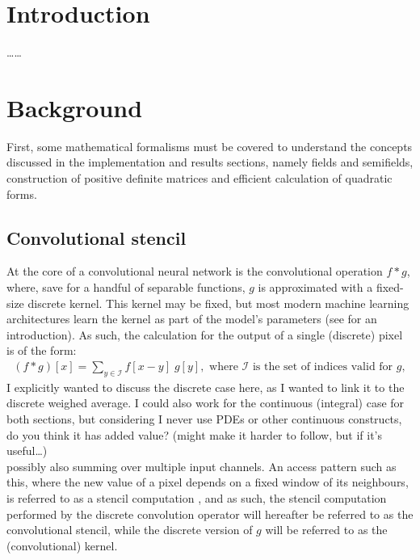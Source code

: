 \documentclass[a4paper, 12pt]{report}
\def\comment#1{\color{red}#1\color{black}}
\begin{document}
\newpage



\setcounter{page}{1}
\pagestyle{plain} 

\chapter{Introduction}
\comment{\ldots\ldots}

\chapter{Background}
First, some mathematical formalisms must be covered to understand the concepts discussed in the implementation and results sections, namely fields and semifields, construction of positive definite matrices and efficient calculation of quadratic forms.

\section{Convolutional stencil}
At the core of a convolutional neural network is the convolutional operation $f*g$, where, save for a handful of separable functions, $g$ is approximated with a fixed-size discrete kernel. This kernel may be fixed, but most modern machine learning architectures learn the kernel as part of the model's parameters (see \cite{introconvnets} for an introduction). As such, the calculation for the output of a single (discrete) pixel is of the form:
\begin{align*}
(f*g)[x] = \sum_{y\in\mathcal{I}} f[x-y]\; g[y]	, \textrm{ where } \mathcal{I} \textrm{ is the set of indices valid for }g,
\end{align*}
\comment{I explicitly wanted to discuss the discrete case here, as I wanted to link it to the discrete weighed average. I could also work for the continuous (integral) case for both sections, but considering I never use PDEs or other continuous constructs, do you think it has added value? (might make it harder to follow, but if it's useful\ldots) \\}
possibly also summing over multiple input channels. An access pattern such as this, where the new value of a pixel depends on a fixed window of its neighbours, is referred to as a stencil computation \cite{fortranstencils}, and as such, the stencil computation performed by the discrete convolution operator will hereafter be referred to as the convolutional stencil, while the discrete version of $g$ will be referred to as the (convolutional) kernel.
\end{document}

